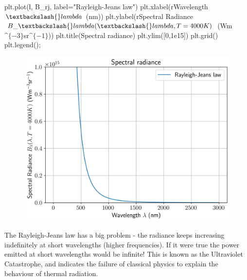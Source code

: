 \documentclass[
  letterpaper,
  DIV=11,
  numbers=noendperiod]{scrreprt}
\newenvironment{Shaded}{\begin{snugshade}}{\end{snugshade}}
\newcommand{\DecValTok}[1]{\textcolor[rgb]{0.68,0.00,0.00}{#1}}
\newcommand{\FloatTok}[1]{\textcolor[rgb]{0.68,0.00,0.00}{#1}}
\newcommand{\NormalTok}[1]{\textcolor[rgb]{0.00,0.23,0.31}{#1}}
\newcommand{\OperatorTok}[1]{\textcolor[rgb]{0.37,0.37,0.37}{#1}}
\newcommand{\StringTok}[1]{\textcolor[rgb]{0.13,0.47,0.30}{#1}}
\newcommand{\VerbatimStringTok}[1]{\textcolor[rgb]{0.13,0.47,0.30}{#1}}
\begin{document}
\begin{Shaded}
\begin{Highlighting}[]
\NormalTok{plt.plot(l, B\_rj, label}\OperatorTok{=}\StringTok{"Rayleigh{-}Jeans law"}\NormalTok{)}
\NormalTok{plt.xlabel(}\VerbatimStringTok{r\textquotesingle{}Wavelength $\textbackslash{}lambda$ (nm)\textquotesingle{}}\NormalTok{)}
\NormalTok{plt.ylabel(}\VerbatimStringTok{r\textquotesingle{}Spectral Radiance $B\_\textbackslash{}lambda(\textbackslash{}lambda, T=4000K)$ (Wm$\^{}\{{-}3\}$sr$\^{}\{{-}1\}$)\textquotesingle{}}\NormalTok{)}
\NormalTok{plt.title(}\StringTok{\textquotesingle{}Spectral radiance\textquotesingle{}}\NormalTok{)}
\NormalTok{plt.ylim([}\DecValTok{0}\NormalTok{,}\FloatTok{1e15}\NormalTok{])}
\NormalTok{plt.grid()}
\NormalTok{plt.legend()}\OperatorTok{;}
\end{Highlighting}
\end{Shaded}

\begin{figure}[H]

{\centering \includegraphics{SP1.1_-_Stellar_Properties_files/figure-pdf/cell-18-output-1.png}

}

\end{figure}

The Rayleigh-Jeans law has a big problem - the radiance keeps increasing
indefinitely at short wavelengths (higher frequencies). If it were true
the power emitted at short wavelengths would be infinite! This is known
as the Ultraviolet Catastrophe, and indicates the failure of classical
physics to explain the behaviour of thermal radiation.
\end{document}
